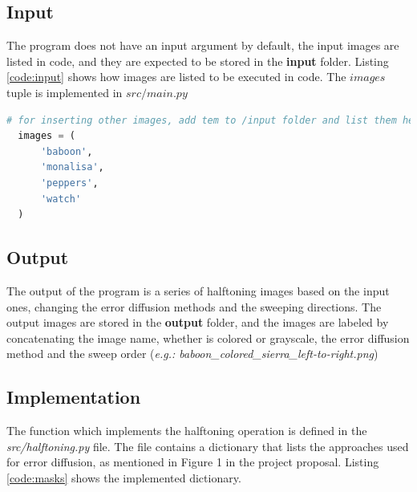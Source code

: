 \documentclass[]{IEEEtran}
\begin{document}
\subsection{Input}

The program does not have an input argument by default, the input images are listed in code, and they are expected to be stored in the \textbf{input} folder. Listing \ref{code:input} shows how images are listed to be executed in code. The $images$ tuple is implemented in $src/main.py$

\begin{lstlisting}[language=Python, caption={Input images inside code}, label={code:input}]
  # for inserting other images, add tem to /input folder and list them here
  images = (
      'baboon',
      'monalisa',
      'peppers',
      'watch'
  )
\end{lstlisting}

\subsection{Output}
The output of the program is a series of halftoning images based on the input ones, changing the error diffusion methods and the sweeping directions. The output images are stored in the \textbf{output} folder, and the images are labeled by concatenating the image name, whether is colored or grayscale, the error diffusion method and the sweep order (\textit{e.g.: baboon\_colored\_sierra\_left-to-right.png})

\subsection{Implementation}
The function which implements the halftoning operation is defined in the \textit{src/halftoning.py} file. The file contains a dictionary that lists the approaches used for error diffusion, as mentioned in Figure 1 in the project proposal. Listing \ref{code:masks} shows the implemented dictionary.
\end{document}
